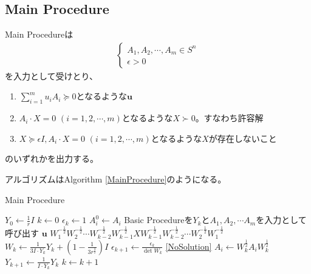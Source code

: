 \subsection{Main Procedure}
Main Procedureは
\begin{align*}
  \left\{
    \begin{array}{l}
      A_1, A_2, \cdots, A_m \in S^n \\
      \epsilon > 0
    \end{array}
  \right.
\end{align*}
を入力として受けとり、
\begin{enumerate}[label=(\alph*)]
  \item $\displaystyle{\sum_{i = 1}^m u_i A_i \succeq 0}$となるような$\mathbf{u}$ \label{DualSolution}
  \item $A_i \cdot X = 0 \,\, (i = 1, 2, \cdots, m)$となるような$X \succ 0$。すなわち許容解 \label{FeasibleSolution}
  \item $X \succeq \epsilon I, A_i \cdot X = 0 \,\, (i = 1, 2, \cdots, m)$となるような$X$が存在しないこと \label{NoSolution}
\end{enumerate}
のいずれかを出力する。

アルゴリズムはAlgorithm \ref{MainProcedure}のようになる。
\begin{algorithm}
  \caption{Main Procedure}
  \label{MainProcedure}
  \begin{algorithmic}[1]
    \State $\displaystyle{Y_0 \leftarrow \frac{1}{r} I}$
    \State $k \leftarrow 0$
    \State $\epsilon_k \leftarrow 1$
      \State $A_i^0 \leftarrow A_i$
    \EndFor
    \State Basic Procedureを$Y_k$と$A_1, A_2, \cdots A_m$を入力として呼び出す \label{CallBasicProcedure}
      \State \Return $\mathbf{u}$
      \State \Return $\displaystyle{W_1^{-\frac{1}{2}} W_2^{-\frac{1}{2}} \cdots W_{k - 2}^{-\frac{1}{2}} W_{k - 1}^{-\frac{1}{2}} X W_{k - 1}^{-\frac{1}{2}} W_{k - 2}^{-\frac{1}{2}} \cdots W_2^{-\frac{1}{2}} W_1^{-\frac{1}{2}}}$
    \EndIf
    \State $\displaystyle{W_k \leftarrow \frac{1}{3 I \cdot Y_k} Y_k + (1 - \frac{1}{3 r^\frac{3}{2}}) I}$
    \State $\displaystyle{\epsilon_{k + 1} \leftarrow \frac{\epsilon_k}{\det W_k}}$
      \State \Return \ref{NoSolution}
    \EndIf
      \State $\displaystyle{A_i \leftarrow W_k^\frac{1}{2} A_i W_k^\frac{1}{2}}$
    \EndFor
    \State $\displaystyle{Y_{k + 1} \leftarrow \frac{1}{I \cdot Y_k} Y_k}$
    \State $k \leftarrow k + 1$
    \State {}
  \end{algorithmic}
\end{algorithm}
